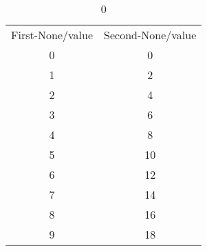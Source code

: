 \begin{table}
	\caption{0}
	\label{tab:test_big}
	\begin{tabular}{cc}
		First-None/value	&	Second-None/value	\\
		0	&	0	\\
		1	&	2	\\
		2	&	4	\\
		3	&	6	\\
		4	&	8	\\
		5	&	10	\\
		6	&	12	\\
		7	&	14	\\
		8	&	16	\\
		9	&	18	\\
	\end{tabular}
\end{table}
